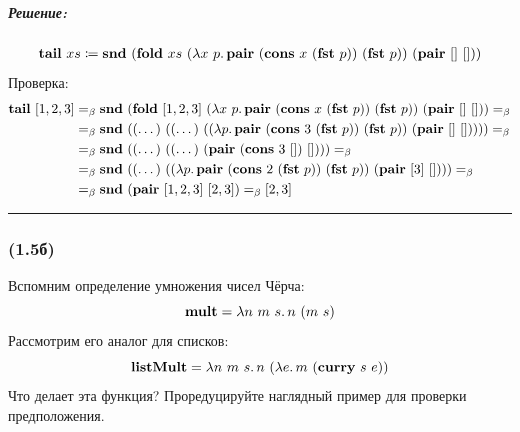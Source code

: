 \documentclass{article}
\newenvironment{proof}{\subparagraph{\hspace{-1em}Решение:\newline}\-}{\par\noindent\rule{\textwidth}{0.4pt}}
\newcommand{\term}[1]{\mathbf{#1}}
\newcommand{\eqbeta}{=_\beta}
\begin{document}
    \begin{proof}
        \begin{gather}
            \term{tail}~xs \coloneqq \term{snd}~(\term{fold}~xs~(\lambda x~p\ldotp \term{pair}~(\term{cons}~x~(\term{fst}~p))~(\term{fst}~p))~(\term{pair}~[]~[]))
        \end{gather}
        Проверка:
        \begin{align}
            \term{tail}~[1, 2, 3] & \eqbeta \term{snd}~(\term{fold}~[1, 2, 3]~(\lambda x~p\ldotp \term{pair}~(\term{cons}~x~(\term{fst}~p))~(\term{fst}~p))~(\term{pair}~[]~[])) \eqbeta \\
                                  & \eqbeta \term{snd}~((\dots)~((\dots)~((\lambda p\ldotp \term{pair}~(\term{cons}~3~(\term{fst}~p))~(\term{fst}~p))~(\term{pair}~[]~[])))) \eqbeta \\
                                  & \eqbeta \term{snd}~((\dots)~((\dots)~(\term{pair}~(\term{cons}~3~[])~[]))) \eqbeta \\
                                  & \eqbeta \term{snd}~((\dots)~((\lambda p\ldotp \term{pair}~(\term{cons}~2~(\term{fst}~p))~(\term{fst}~p))~(\term{pair}~[3]~[]))) \eqbeta \\
                                  & \eqbeta \term{snd}~(\term{pair}~[1, 2, 3]~[2, 3]) \eqbeta [2, 3] \\
        \end{align}
    \end{proof}

    \subsubsection{(1.5б)}

    Вспомним определение умножения чисел Чёрча:
    \[\term{mult} = \lambda n~m~s\ldotp n~(m~s)\]
    Рассмотрим его аналог для списков:
    \[\term{listMult} = \lambda n~m~s\ldotp n~(\lambda e\ldotp m~(\term{curry}~s~e))\]
    Что делает эта функция?
    Проредуцируйте наглядный пример для проверки предположения.
\end{document}
